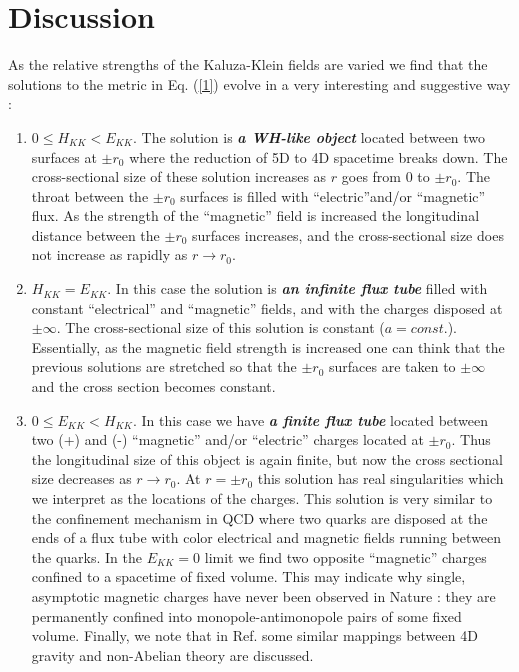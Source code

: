 \section{Discussion} 

As the relative strengths of the Kaluza-Klein fields are
varied we find that the solutions to the metric in
Eq. (\ref{1}) evolve in a very interesting and suggestive way :
\begin{enumerate} 
\item 
$0 \le H_{KK} <E_{KK} $. The solution 
is \textbf{\textit{a WH-like object}} 
located between two surfaces at $\pm r_0$ where the
reduction of 5D to 4D spacetime breaks down. The cross-sectional
size of these solution increases as $r$ goes from $0$
to $\pm r_0$. The throat between the $\pm r_0$ surfaces is
filled with ``electric''and/or ``magnetic'' flux. As the strength
of the ``magnetic'' field is increased the longitudinal
distance between the $\pm r_0$ surfaces increases, and
the cross-sectional size does not increase as rapidly
as $r \rightarrow r_0$.
\item 
$H_{KK} = E_{KK}$. In this case the solution is 
\textbf{\textit{an infinite flux tube}} filled
with constant ``electrical'' and ``magnetic'' fields, and
with the charges disposed at $\pm \infty$. The cross-sectional
size of this solution is constant ($ a= const.$). Essentially,
as the magnetic field strength is increased one can think that
the previous solutions are stretched so that the
$\pm r_0$ surfaces are taken to $\pm \infty$ and the cross section
becomes constant.  
\item 
$0 \le E_{KK} < H_{KK}$. In this case we have
\textbf{\textit{a finite flux tube}} located 
between two (+) and (-) ``magnetic'' and/or ``electric'' 
charges located at $\pm r_0$. Thus the longitudinal 
size of this object is again finite, but now the cross
sectional size decreases as $r \rightarrow r_0$. At
$r = \pm r_0$ this solution has real singularities which
we interpret as the locations of the charges. 
This solution is very similar to the confinement 
mechanism in QCD where two quarks are 
disposed at the ends of a flux tube with color electrical 
and magnetic fields running between the quarks.
In the $E_{KK} = 0$ limit we find two opposite ``magnetic'' charges
confined to a spacetime of fixed volume.
This may indicate why single, asymptotic magnetic charges
have never been observed in Nature : they are permanently
confined into monopole-antimonopole pairs of some fixed
volume. Finally,  we note that in Ref. \cite{singl}
some similar mappings between 4D gravity and non-Abelian 
theory are discussed.
\end{enumerate} 
